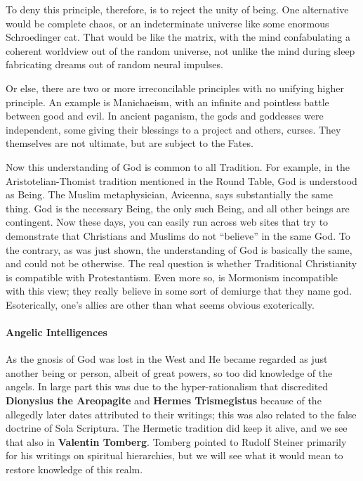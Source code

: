 To deny this principle, therefore, is to reject the unity of being. One alternative would be complete chaos, or an indeterminate universe like some enormous Schroedinger cat. That would be like the matrix, with the mind confabulating a coherent worldview out of the random universe, not unlike the mind during sleep fabricating dreams out of random neural impulses.

Or else, there are two or more irreconcilable principles with no unifying higher principle. An example is Manichaeism, with an infinite and pointless battle between good and evil. In ancient paganism, the gods and goddesses were independent, some giving their blessings to a project and others, curses. They themselves are not ultimate, but are subject to the Fates.

Now this understanding of God is common to all Tradition. For example, in the Aristotelian-Thomist tradition mentioned in the Round Table, God is understood as Being. The Muslim metaphysician, Avicenna, says substantially the same thing. God is the necessary Being, the only such Being, and all other beings are contingent. Now these days, you can easily run across web sites that try to demonstrate that Christians and Muslims do not “believe” in the same God. To the contrary, as was just shown, the understanding of God is basically the same, and could not be otherwise. The real question is whether Traditional Christianity is compatible with Protestantism. Even more so, is Mormonism incompatible with this view; they really believe in some sort of demiurge that they name god. Esoterically, one's allies are other than what seems obvious exoterically.

\paragraph{Angelic Intelligences}
As the gnosis of God was lost in the West and He became regarded as just another being or person, albeit of great powers, so too did knowledge of the angels. In large part this was due to the hyper-rationalism that discredited \textbf{Dionysius the Areopagite} and \textbf{Hermes Trismegistus} because of the allegedly later dates attributed to their writings; this was also related to the false doctrine of Sola Scriptura. The Hermetic tradition did keep it alive, and we see that also in \textbf{Valentin Tomberg}. Tomberg pointed to Rudolf Steiner primarily for his writings on spiritual hierarchies, but we will see what it would mean to restore knowledge of this realm.

